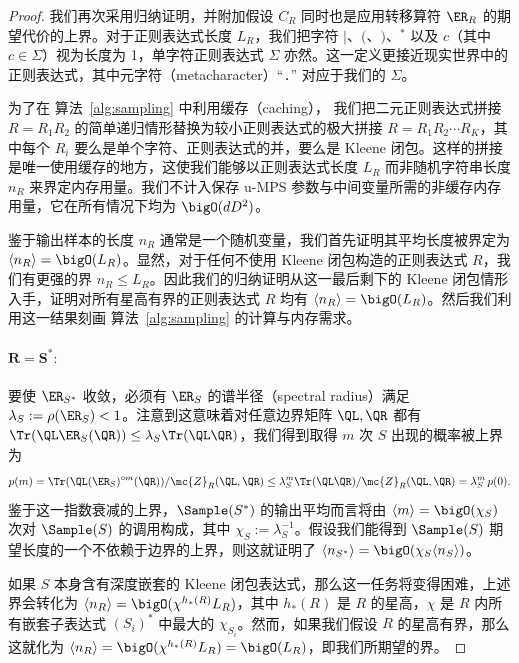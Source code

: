 \begin{proof}

我们再次采用归纳证明，并附加假设 $C_R$ 同时也是应用转移算符 $\ER_R$ 的期望代价的上界。对于正则表达式长度 $L_R$，我们把字符 $|$、$($、$)$、$^*$ 以及 $c$（其中 $c \in \Sigma$）视为长度为 1，单字符正则表达式 $\Sigma$ 亦然。这一定义更接近现实世界中的正则表达式，其中元字符（metacharacter）``\texttt{.}'' 对应于我们的 $\Sigma$。

为了在 算法~\ref{alg:sampling} 中利用缓存（caching），
我们把二元正则表达式拼接 $R = R_1 R_2$ 的简单递归情形替换为较小正则表达式的极大拼接 $R = R_1 R_2 \cdots R_K$，其中每个 $R_i$ 要么是单个字符、正则表达式的并，要么是 Kleene 闭包。这样的拼接是唯一使用缓存的地方，这使我们能够以正则表达式长度 $L_R$ 而非随机字符串长度 $n_R$ 来界定内存用量。我们不计入保存 u-MPS 参数与中间变量所需的非缓存内存用量，它在所有情况下均为 $\bigO(d D^2)$。

鉴于输出样本的长度 $n_R$ 通常是一个随机变量，我们首先证明其平均长度被界定为 $\langle n_R \rangle = \bigO(L_R)$。显然，对于任何不使用 Kleene 闭包构造的正则表达式 $R$，我们有更强的界 $n_R \leq L_R$。因此我们的归纳证明从这一最后剩下的 Kleene 闭包情形入手，证明对所有星高有界的正则表达式 $R$ 均有 $\langle n_R \rangle = \bigO(L_R)$。然后我们利用这一结果刻画 算法~\ref{alg:sampling} 的计算与内存需求。

\paragraph{$\mathbf{R = S^*:}$} 要使 $\ER_{S^*}$ 收敛，必须有 $\ER_S$ 的谱半径（spectral radius）满足 $\lambda_S := \rho(\ER_S) < 1$。注意到这意味着对任意边界矩阵 $\QL, \QR$ 都有 $\Tr(\QL \ER_S(\QR)) \leq \lambda_S \Tr(\QL \QR)$，我们得到取得 $m$ 次 $S$ 出现的概率被上界为
%
\begin{equation*}
p(m) = \Tr(\QL (\ER_S)^{\circ m}(\QR)) / \mc{Z}_R(\QL, \QR) \leq \lambda_S^m \Tr(\QL \QR) / \mc{Z}_R(\QL, \QR) = \lambda_S^m\, p(0).
\end{equation*}
%
鉴于这一指数衰减的上界，$\Sample(S^*)$ 的输出平均而言将由 $\langle m \rangle = \bigO(\chi_S)$ 次对 $\Sample(S)$ 的调用构成，其中 $\chi_S := \lambda_S^{-1}$。假设我们能得到 $\Sample(S)$ 期望长度的一个不依赖于边界的上界，则这就证明了 $\langle n_{S^*} \rangle = \bigO(\chi_S \langle n_S \rangle)$。

如果 $S$ 本身含有深度嵌套的 Kleene 闭包表达式，那么这一任务将变得困难，上述界会转化为 $\langle n_R \rangle = \bigO(\chi^{h_*(R)} L_R)$，其中 $h_*(R)$ 是 $R$ 的星高，$\chi$ 是 $R$ 内所有嵌套子表达式 $(S_i)^*$ 中最大的 $\chi_{S_i}$。然而，如果我们假设 $R$ 的星高有界，那么这就化为 $\langle n_R \rangle = \bigO(\chi^{h_*(R)} L_R) = \bigO(L_R)$，即我们所期望的界。


\end{proof}
